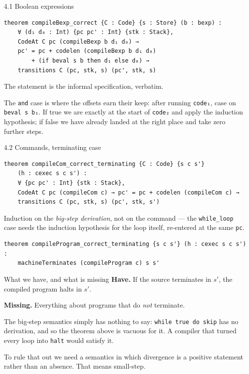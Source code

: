 \documentclass[aspectratio=169,10pt]{beamer}
\newcommand{\code}[1]{\texttt{\small #1}}
\begin{document}
\begin{frame}[fragile]{4.1 Boolean expressions}
\begin{lstlisting}
theorem compileBexp_correct {C : Code} {s : Store} (b : bexp) :
    ∀ (d₁ d₀ : Int) {pc pc' : Int} {stk : Stack},
    CodeAt C pc (compileBexp b d₁ d₀) →
    pc' = pc + codelen (compileBexp b d₁ d₀)
        + (if beval s b then d₁ else d₀) →
    transitions C (pc, stk, s) (pc', stk, s)
\end{lstlisting}
The statement is the informal specification, verbatim.
\medskip

The \code{and} case is where the offsets earn their keep: after running
\code{code₁}, case on \code{beval s b₁}.  If true we are exactly at the start
of \code{code₂} and apply the induction hypothesis; if false we have already
landed at the right place and take zero further steps.
\end{frame}

\begin{frame}[fragile]{4.2 Commands, terminating case}
\begin{lstlisting}
theorem compileCom_correct_terminating {C : Code} {s c s'}
    (h : cexec s c s') :
    ∀ {pc pc' : Int} {stk : Stack},
    CodeAt C pc (compileCom c) → pc' = pc + codelen (compileCom c) →
    transitions C (pc, stk, s) (pc', stk, s')
\end{lstlisting}
Induction on the \emph{big-step derivation}, not on the command --- the
\code{while\_loop} case needs the induction hypothesis for the loop itself,
re-entered at the same \code{pc}.
\medskip

\begin{lstlisting}
theorem compileProgram_correct_terminating {s c s'} (h : cexec s c s') :
    machineTerminates (compileProgram c) s s'
\end{lstlisting}
\end{frame}

\begin{frame}{What we have, and what is missing}
\textbf{Have.}  If the source terminates in $s'$, the compiled program halts
in $s'$.
\medskip

\textbf{Missing.}  Everything about programs that do \emph{not} terminate.
\medskip

The big-step semantics simply has nothing to say: \code{while true do skip}
has no derivation, and so the theorem above is vacuous for it.  A compiler
that turned every loop into \code{halt} would satisfy it.
\medskip
\pause

To rule that out we need a semantics in which divergence is a positive
statement rather than an absence.  That means small-step.
\end{frame}
\end{document}

